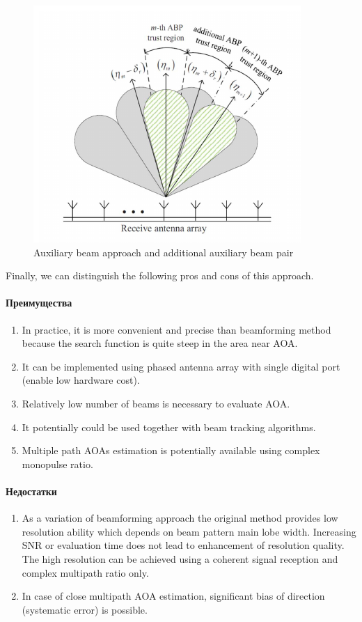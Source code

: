 \begin{figure}[h]
    \centering
    \includegraphics[width=0.6\linewidth]{figs/fig3.14}
    \caption{Auxiliary beam approach and additional auxiliary beam pair
    \cite{Tuncer2009}}
    \label{fig:}
\end{figure}

Finally, we can distinguish the following pros and cons of this approach.
\paragraph{Преимущества}%
\label{par:preimushchestva}

\begin{enumerate}
    \item In practice, it is more convenient and precise than beamforming
        method because the search function is quite steep in the area near AOA.
    \item It can be implemented using phased antenna array with single digital
        port (enable low hardware cost).
    \item Relatively low number of beams is necessary to evaluate AOA.
    \item It potentially could be used together with beam tracking algorithms.
    \item Multiple path AOAs estimation is potentially available using complex
        monopulse ratio.
\end{enumerate}

\paragraph{Недостатки}%
\label{par:nedostatki}
\begin{enumerate}
    \item As a variation of beamforming approach the original method provides
        low resolution ability which depends on beam pattern main lobe width.
        Increasing SNR or evaluation time does not lead to enhancement of
        resolution quality. The high resolution can be achieved using a
        coherent signal reception and complex multipath ratio only.
    \item In case of close multipath AOA estimation, significant bias of
        direction (systematic error) is possible.
\end{enumerate}

